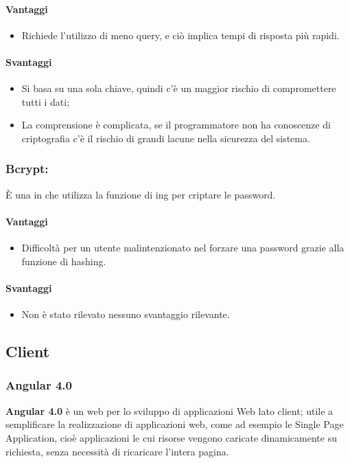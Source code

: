 	\paragraph{Vantaggi}
	\begin{itemize}
	\item Richiede l'utilizzo di meno query, e ciò implica tempi di risposta più rapidi.	
	\end{itemize}

	\paragraph{Svantaggi}
	\begin{itemize}
	\item Si basa su una sola chiave, quindi c'è un maggior rischio di compromettere tutti i dati;
	\item La comprensione è complicata, se il programmatore non ha conoscenze di criptografia c'è il rischio di grandi lacune nella sicurezza del sistema.
	\end{itemize}
	\subsubsection{Bcrypt:} È una  in  che utilizza la funzione di ing per criptare le password.
	\paragraph{Vantaggi}
		\begin{itemize}
		\item Difficoltà per un utente malintenzionato nel forzare una password grazie alla funzione di hashing.
		\end{itemize}
		
		\paragraph{Svantaggi}
		\begin{itemize}
		\item Non è stato rilevato nessuno svantaggio rilevante.
		\end{itemize}
\subsection{Client}

	\subsubsection{Angular 4.0}
	\textbf{Angular 4.0} è un  web  per lo sviluppo di applicazioni Web lato client; utile a semplificare la realizzazione di applicazioni web, come ad esempio le Single Page Application, cioè applicazioni le cui risorse vengono caricate dinamicamente su richiesta, senza necessità di ricaricare l’intera pagina.

